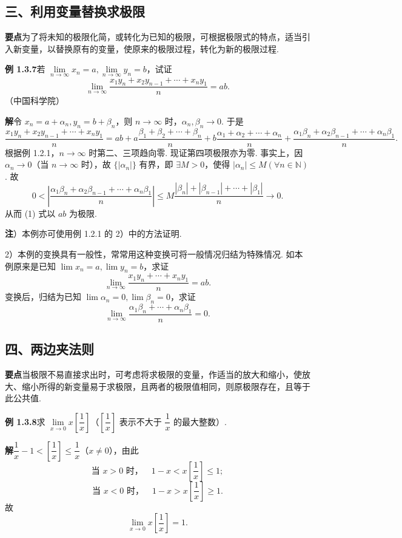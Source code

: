 \documentclass[UTF8,12pt,a4paper,fontset=fandol]{ctexart}
\begin{document}
\subsection*{三、利用变量替换求极限}

\noindent\textbf{要点}\quad 为了将未知的极限化简，或转化为已知的极限，可根据极限式的特点，适当引入新变量，以替换原有的变量，使原来的极限过程，转化为新的极限过程.

\noindent\textbf{例 1.3.7}\quad 若 $\lim\limits_{n\to\infty}x_n=a,\lim\limits_{n\to\infty}y_n=b$，试证
\[
  \lim_{n\to\infty}\frac{x_1y_n+x_2y_{n-1}+\cdots+x_ny_1}{n}=ab.
\]
（中国科学院）

\noindent\textbf{解}\quad 令 $x_n=a+\alpha_n,y_n=b+\beta_n$，则 $n\to\infty$ 时，$\alpha_n,\beta_n\to0$. 于是
\[
\frac{x_1y_n+x_2y_{n-1}+\cdots+x_ny_1}{n}
=ab+a\frac{\beta_1+\beta_2+\cdots+\beta_n}{n}
+b\frac{\alpha_1+\alpha_2+\cdots+\alpha_n}{n}
+\frac{\alpha_1\beta_n+\alpha_2\beta_{n-1}+\cdots+\alpha_n\beta_1}{n}.
\tag{1}
\]
根据例 1.2.1，$n\to\infty$ 时第二、三项趋向零. 现证第四项极限亦为零. 事实上，因 $\alpha_n\to0$（当 $n\to\infty$ 时），故 $\{|\alpha_n|\}$ 有界，即 $\exists M>0$，使得 $|\alpha_n|\le M(\forall n\in\mathbb{N})$. 故
\[
0<\left|\frac{\alpha_1\beta_n+\alpha_2\beta_{n-1}+\cdots+\alpha_n\beta_1}{n}\right|
\le M\frac{|\beta_n|+|\beta_{n-1}|+\cdots+|\beta_1|}{n}\to0.
\]
从而 (1) 式以 $ab$ 为极限.

\noindent\textbf{注}）本例亦可使用例 1.2.1 的 2）中的方法证明.

2）本例的变换具有一般性，常常用这种变换可将一般情况归结为特殊情况. 如本例原来是已知 $\lim x_n=a,\lim y_n=b$，求证
\[
  \lim_{n\to\infty}\frac{x_1y_n+\cdots+x_ny_1}{n}=ab.
\]
变换后，归结为已知 $\lim\alpha_n=0,\lim\beta_n=0$，求证
\[
  \lim_{n\to\infty}\frac{\alpha_1\beta_n+\cdots+\alpha_n\beta_1}{n}=0.
\]

\subsection*{四、两边夹法则}

\noindent\textbf{要点}\quad 当极限不易直接求出时，可考虑将求极限的变量，作适当的放大和缩小，使放大、缩小所得的新变量易于求极限，且两者的极限值相同，则原极限存在，且等于此公共值.

\noindent\textbf{例 1.3.8}\quad 求 $\lim\limits_{x\to0}x\left[\dfrac1x\right]$（$\left[\dfrac1x\right]$ 表示不大于 $\dfrac1x$ 的最大整数）.

\noindent\textbf{解}\quad $\dfrac1x-1<\left[\dfrac1x\right]\le\dfrac1x$（$x\ne0$），由此
\[
\text{当 }x>0\text{ 时，}\quad 1-x<x\left[\frac1x\right]\le1;
\]
\[
\text{当 }x<0\text{ 时，}\quad 1-x>x\left[\frac1x\right]\ge1.
\]
故
\[
  \lim_{x\to0}x\left[\frac1x\right]=1.
\]
\end{document}
